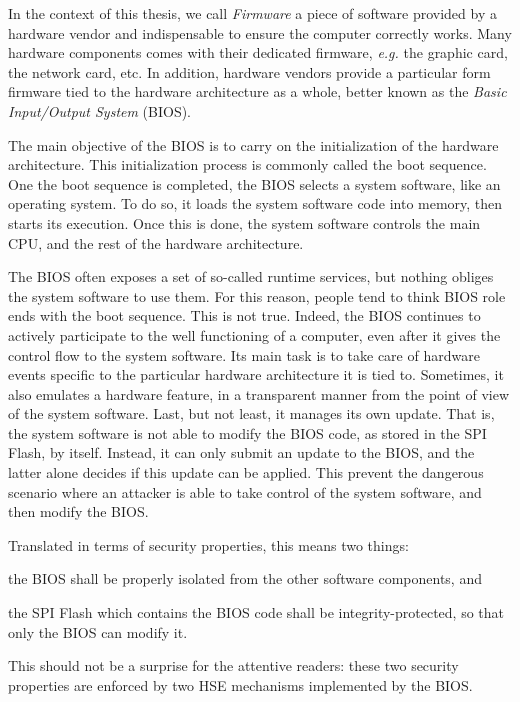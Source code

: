 In the context of this thesis, we call \emph{Firmware} a piece of software
provided by a hardware vendor and indispensable to ensure the computer correctly
works.
%
Many hardware components comes with their dedicated firmware, \emph{e.g.} the
graphic card, the network card, etc.
%
In addition, hardware vendors provide a particular form firmware tied to the
hardware architecture as a whole, better known as the \emph{Basic Input/Output
  System} (BIOS). %

The main objective of the BIOS is to carry on the initialization of the hardware
architecture.
%
This initialization process is commonly called the boot sequence.
%
One the boot sequence is completed, the BIOS selects a system software, like an
operating system.
%
To do so, it loads the system software code into memory, then starts its
execution.
%
Once this is done, the system software controls the main CPU, and the rest of
the hardware architecture.

The BIOS often exposes a set of so-called runtime services, but nothing obliges
the system software to use them.
%
For this reason, people tend to think BIOS role ends with the boot sequence.
%
This is not true.
%
Indeed, the BIOS continues to actively participate to the well functioning of a
computer, even after it gives the control flow to the system software.
%
Its main task is to take care of hardware events specific to the particular
hardware architecture it is tied to.
%
Sometimes, it also emulates a hardware feature, in a transparent manner from the
point of view of the system software.  
%
Last, but not least, it manages its own update.
%
That is, the system software is not able to modify the BIOS code, as stored in
the SPI Flash, by itself.
%
Instead, it can only submit an update to the BIOS, and the latter alone decides
if this update can be applied.
%
This prevent the dangerous scenario where an attacker is able to take control of
the system software, and then modify the BIOS.

Translated in terms of security properties, this means two things:
%
\begin{inparaenum}[(1)]
\item the BIOS shall be properly isolated from the other software components,
  and
\item the SPI Flash which contains the BIOS code shall be integrity-protected,
  so that only the BIOS can modify it.
\end{inparaenum}
%
This should not be a surprise for the attentive readers: these two security
properties are enforced by two HSE mechanisms implemented by the BIOS.


